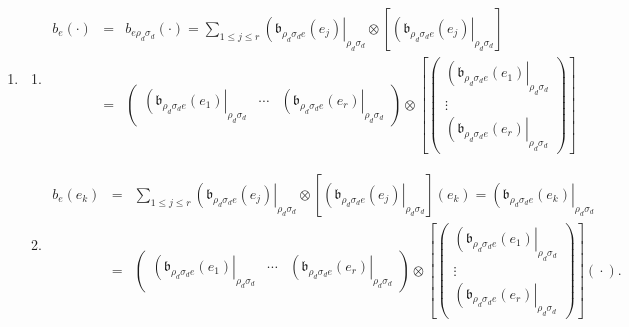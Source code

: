 \documentclass[aps,preprint]{revtex4}
\begin{document}
\begin{enumerate}
\item 
\begin{enumerate}
\item 
\begin{eqnarray}
b_{e}\left( \cdot \right) &=&b_{e\rho _{d}\sigma _{d}}\left( \cdot \right)
=\sum_{1\leq j\leq r}\left( \mathfrak{b}_{\rho _{d}\sigma _{d}e}\left(
e_{j}\right) \right\vert _{\rho _{d}\sigma _{d}}\otimes \left[ \left( 
\mathfrak{b}_{\rho _{d}\sigma _{d}e}\left( e_{j}\right) \right\vert _{\rho
_{d}\sigma _{d}}\right] \\
&=&\left( 
\begin{array}{ccc}
\left( \mathfrak{b}_{\rho _{d}\sigma _{d}e}\left( e_{1}\right) \right\vert
_{\rho _{d}\sigma _{d}} & \cdots & \left( \mathfrak{b}_{\rho _{d}\sigma
_{d}e}\left( e_{r}\right) \right\vert _{\rho _{d}\sigma _{d}}%
\end{array}%
\right) \otimes \left[ \left( 
\begin{array}{c}
\left( \mathfrak{b}_{\rho _{d}\sigma _{d}e}\left( e_{1}\right) \right\vert
_{\rho _{d}\sigma _{d}} \\ 
\vdots \\ 
\left( \mathfrak{b}_{\rho _{d}\sigma _{d}e}\left( e_{r}\right) \right\vert
_{\rho _{d}\sigma _{d}}%
\end{array}%
\right) \right]
\end{eqnarray}

\item 
\begin{eqnarray}
b_{e}\left( e_{k}\right) &=&\sum_{1\leq j\leq r}\left( \mathfrak{b}_{\rho
_{d}\sigma _{d}e}\left( e_{j}\right) \right\vert _{\rho _{d}\sigma
_{d}}\otimes \left[ \left( \mathfrak{b}_{\rho _{d}\sigma _{d}e}\left(
e_{j}\right) \right\vert _{\rho _{d}\sigma _{d}}\right] \left( e_{k}\right)
=\left( \mathfrak{b}_{\rho _{d}\sigma _{d}e}\left( e_{k}\right) \right\vert
_{\rho _{d}\sigma _{d}} \\
&=&\left( 
\begin{array}{ccc}
\left( \mathfrak{b}_{\rho _{d}\sigma _{d}e}\left( e_{1}\right) \right\vert
_{\rho _{d}\sigma _{d}} & \cdots & \left( \mathfrak{b}_{\rho _{d}\sigma
_{d}e}\left( e_{r}\right) \right\vert _{\rho _{d}\sigma _{d}}%
\end{array}%
\right) \otimes \left[ \left( 
\begin{array}{c}
\left( \mathfrak{b}_{\rho _{d}\sigma _{d}e}\left( e_{1}\right) \right\vert
_{\rho _{d}\sigma _{d}} \\ 
\vdots \\ 
\left( \mathfrak{b}_{\rho _{d}\sigma _{d}e}\left( e_{r}\right) \right\vert
_{\rho _{d}\sigma _{d}}%
\end{array}%
\right) \right] \left( \overset{}{\cdot }\right) .
\end{eqnarray}


\end{enumerate}
\end{enumerate}
\end{document}
